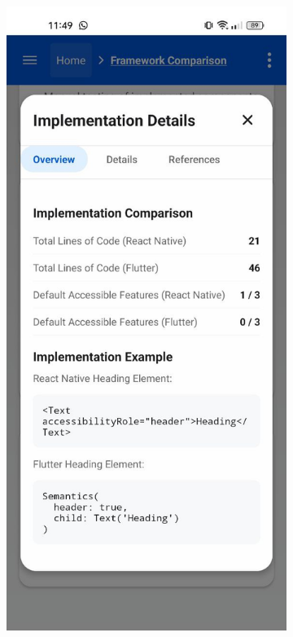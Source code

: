 \begin{figure}[ht]
    \centering
    \begin{subfigure}[b]{0.37\textwidth}
        \centering
        \includegraphics[width=\linewidth, alt={Implementation Complexity Analysis card}]{img/methodology-overview.jpg}

\end{subfigure}
\end{figure}
